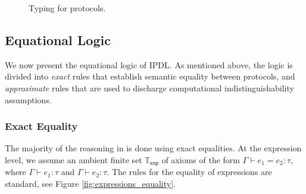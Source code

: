 \begin{figure*}
\caption{Typing for \ipdl protocols.}
\label{fig:protocols_typing}
\end{figure*}

\subsection{Equational Logic}
We now present the equational logic of \textsf{IPDL}. As mentioned above, the logic is divided into \emph{exact} rules that establish semantic equality between protocols, and \emph{approximate} rules that are used to discharge computational indistinguishability assumptions. 

\subsubsection{Exact Equality}
The majority of the reasoning in \ipdl is done using exact equalities. At the expression level, we assume an ambient finite set $\mathbb{T}_\mathsf{exp}$ of axioms of the form $\Gamma \vdash e_1 = e_2 : \tau$, where $\Gamma \vdash e_1 : \tau$ and $\Gamma \vdash e_2 : \tau$. The rules for the equality of expressions are standard, see Figure \ref{fig:expressions_equality}.

